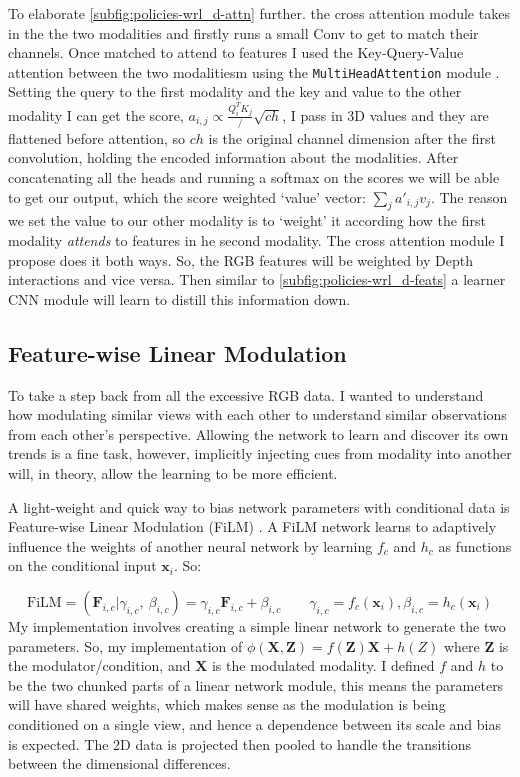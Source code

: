 To elaborate \ref{subfig:policies-wrl_d-attn} further. the cross attention module takes in the the two modalities and firstly runs a small Conv to get to match their channels. Once matched to attend to features I used the Key-Query-Value attention \cite{vaswani2023attentionneed} between the two modalitiesm using the \verb|MultiHeadAttention| module \cite{pytorch}. Setting the query to the first modality and the key and value to the other modality I can get the score, \( a_{i, j} \propto \frac{Q_i^TK_j}/\sqrt{ch}\), I pass in 3D values and they are flattened before attention, so $ch$ is the original channel dimension after the first convolution, holding the encoded information about the modalities. After concatenating all the heads and running a softmax on the scores we will be able to get our output, which the score weighted `value' vector: \(\sum_{j}{{a'}_{i, j}v_j}\). The reason we set the value to our other modality is to `weight' it according how the first modality \emph{attends} to features in he second modality. The cross attention module I propose does it both ways. So, the RGB features will be weighted by Depth interactions and vice versa. Then similar to \ref{subfig:policies-wrl_d-feats} a learner CNN module will learn to distill this information down.


\subsection{Feature-wise Linear Modulation}\label{subsec:policies-film}
To take a step back from all the excessive RGB data. I wanted to understand how modulating similar views with each other to understand similar observations from each other's perspective. Allowing the network to learn and discover its own trends is a fine task, however, implicitly injecting cues from modality into another will, in theory, allow the learning to be more efficient.

A light-weight and quick way to bias network parameters with conditional data is Feature-wise Linear Modulation (FiLM) \cite{perez2017film}. A FiLM network learns to adaptively influence the weights of another neural network by learning $f_c$ and $h_c$ as functions on the conditional input $\mathbf{x}_i$. So:

\[
\text{FiLM} = \left( \mathbf{F}_{i, c} | \gamma_{i, c}, ~\beta_{i, c} \right) = \gamma_{i, c}\mathbf{F}_{i, c} + \beta_{i, c} \qquad  \gamma_{i, c} = f_c\left(\mathbf{x}_i \right), \beta_{i, c} = h_c \left( \mathbf {x}_i \right)
\]
My implementation involves creating a simple linear network to generate the two parameters. So, my implementation of \(\phi\left(\mathbf{X}, \mathbf{Z}\right) = f\left(\mathbf{Z}\right)\mathbf{X} + h\left(Z\right)\) where $\mathbf{Z}$ is the modulator/condition, and $\mathbf{X}$ is the modulated modality. I defined $f$ and $h$ to be the two chunked parts of a linear network module, this means the parameters will have shared weights, which makes sense as the modulation is being conditioned on a single view, and hence a dependence between its scale and bias is expected. The 2D data is projected then pooled to handle the transitions between the dimensional differences.

